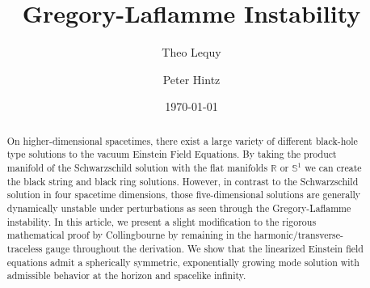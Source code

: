 \documentclass[11pt,aip,jmp,amsmath,amssymb,draft]{revtex4-1}
\begin{document}
\title[Gregory-Laflamme Instability]{Gregory-Laflamme Instability}
\author{Theo Lequy}

\author{Peter Hintz}

\date{\today}%

\begin{abstract}
On higher-dimensional spacetimes, there exist a large variety of different black-hole type solutions to the vacuum Einstein Field Equations. 
By taking the product manifold of the Schwarzschild solution with the flat manifolds $\mathbb{R}$ or $\mathbb{S}^1$ we can create the black string and black ring solutions. 
However, in contrast to the Schwarzschild solution in four spacetime dimensions, those five-dimensional solutions are generally dynamically unstable under perturbations as seen through the Gregory-Laflamme instability.
In this article, we present a slight modification to the rigorous mathematical proof by Collingbourne \cite{collingbourne2021gregory} by remaining in the harmonic/transverse-traceless gauge throughout the derivation.
We show that the linearized Einstein field equations admit a spherically symmetric, exponentially growing mode solution with admissible behavior at the horizon and spacelike infinity. 
\end{abstract}

\maketitle
\end{document}
